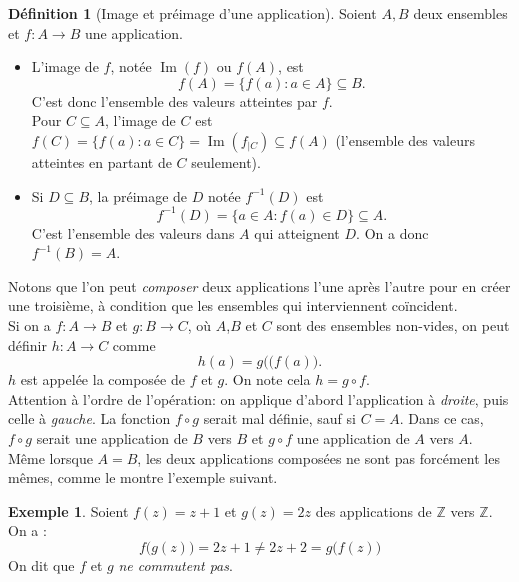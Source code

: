 \documentclass[oneside,12pt,french,table]{book}
\DeclareMathOperator{\im}{Im}
\newcommand{\Z}{\mathbb{Z}}
\theoremstyle{definition}
\theoremstyle{definition}
\newtheorem*{example}{Exemple}
\theoremstyle{definition}
\newtheorem{definition}{Définition}[chapter]
\begin{document}
\begin{definition}[Image et préimage d'une application]
Soient $A,B$ deux ensembles et $f:A\longrightarrow B$ une application.
\begin{itemize}
\item L'image de $f$, notée $\im (f)$ ou $f(A)$, est
	\[
		f(A)=\{f(a): a \in A\} \subseteq B.
	\]
C'est donc l'ensemble des valeurs atteintes par $f$. \\
Pour $C \subseteq A$, l'image de $C$ est $f(C) = \{f(a): a \in C\} = \im(f_{|C}) \subseteq f(A)$ (l'ensemble des valeurs atteintes en partant de $C$ seulement). \\
\item Si $D \subseteq B$, la préimage de $D$ notée $f^{-1}(D)$ est
	\[
		f^{-1} (D)=\{a \in A : f(a) \in D\}\subseteq A.
	\]
C'est l'ensemble des valeurs dans $A$ qui atteignent $D$. On a donc $f^{-1}(B) = A$. \\
\end{itemize}
\end{definition}
\noindent Notons que l'on peut \textit{composer} deux applications l'une après l'autre pour en créer une troisième, à condition que les ensembles qui interviennent coïncident. \\
Si on a $f: A \longrightarrow B$ et $g: B \longrightarrow C$, où $A$,$B$ et $C$ sont des ensembles non-vides, on peut définir $h: A \longrightarrow C$ comme $$h(a) = g \big( (f(a) \big).$$
$h$ est appelée la composée de $f$ et $g$. On note cela $h = g \circ f$. \\
Attention à l'ordre de l'opération: on applique d'abord l'application à \textit{droite}, puis celle à \textit{gauche}. La fonction $f \circ g$ serait mal définie, sauf si $C = A$. Dans ce cas, $f \circ g$ serait une application de $B$ vers $B$ et $g \circ f$ une application de $A$ vers $A$. \\
Même lorsque $A = B$, les deux applications composées ne sont pas forcément les mêmes, comme le montre l'exemple suivant.
\begin{example}
Soient $f(z) = z+1$ et $g(z)=2z$ des applications de $\Z$ vers $\Z$. On a :
$$f \Big( g(z) \Big) = 2z + 1 \neq 2z + 2 = g \Big( f(z) \Big)$$
On dit que $f$ et $g$ \textit{ne commutent pas}.
\end{example}
\end{document}
